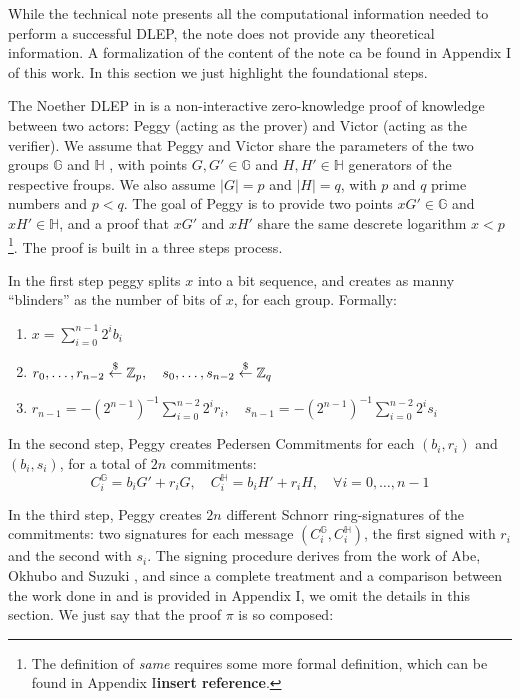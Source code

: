 \documentclass[runningheads]{llncs}
\newcommand{\getsrandom}{\overset{\tiny{\$}}{\leftarrow}}
\newcommand{\seq}[2]{#1,\ldots,#2}
\newcommand{\ggroup}{\mathbb{G}}
\newcommand{\hgroup}{\mathbb{H}}
\newcommand{\ggrouptxt}{$\mathbb{G}$ }
\newcommand{\hgrouptxt}{$\mathbb{H}$ }
\newcommand{\Zp}{\mathbb{Z}_p}
\newcommand{\Zq}{\mathbb{Z}_q}
\begin{document}
While the technical note presents all the computational information needed to perform a successful DLEP, the note does not provide any theoretical information. A formalization of the content of the note ca be found in Appendix I of this work. In this section we just highlight the foundational steps.

The Noether DLEP in \cite{dlep} is a non-interactive zero-knowledge proof of knowledge between two actors: Peggy (acting as the prover) and Victor (acting as the verifier). We assume that Peggy and Victor share the parameters of the two groups \ggrouptxt and \hgrouptxt, with points $G,G'\in\ggroup$ and $H,H' \in\hgroup$ generators of the respective froups. We also assume $|G|=p$ and $|H|=q$, with $p$ and $q$ prime numbers and $p<q$. The goal of Peggy is to provide two points $xG'\in\ggroup$ and $xH'\in\hgroup$, and a proof that $xG'$ and $xH'$ share the same descrete logarithm $x<p$\footnote{The definition of \emph{same} requires some more formal definition, which can be found in Appendix I\textbf{insert reference}.}. The proof is built in a three steps process.

In the first step peggy splits $x$ into a bit sequence, and creates as manny ``blinders'' as the number of bits of $x$, for each group. Formally:
\begin{enumerate}
    \item $x=\sum_{i=0}^{n-1} 2^ib_i$
    \item $r_0,\dots,r_{n-2}\getsrandom\Zp,\quad s_0,\dots,s_{n-2}\getsrandom\Zq$
    \item $r_{n-1}=-(2^{n-1})^{-1}\sum_{i=0}^{n-2} 2^ir_i,\quad s_{n-1}=-(2^{n-1})^{-1}\sum_{i=0}^{n-2} 2^is_i$
\end{enumerate}


In the second step, Peggy creates Pedersen Commitments for each $(b_i,r_i)$ and $(b_i,s_i)$, for a total of $2n$ commitments:
$$
C_i^{\ggroup}=b_iG'+r_iG, \quad C_i^{\hgroup}=b_iH'+r_iH, \quad \forall i=\seq 0 {n-1}
$$

In the third step, Peggy creates $2n$ different Schnorr ring-signatures of the commitments: two signatures for each message $(C_i^{\ggroup}, C_i^{\hgroup})$, the first signed with $r_i$ and the second with $s_i$. The signing procedure derives from the work of Abe, Okhubo and Suzuki \cite{abe04}, and since a complete treatment and a comparison between the work done in \cite{dlep} and \cite{abe04} is provided in Appendix I, we omit the details in this section. We just say that the proof $\pi$ is so composed:
\end{document}
